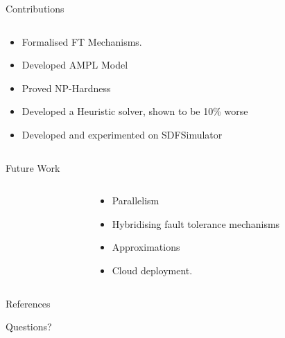 \documentclass{beamer}
\begin{document}
\begin{frame}{Contributions}
\begin{columns}
\begin{column}{5cm}
\begin{itemize}
	\item Formalised FT Mechanisms.
	\item Developed AMPL Model
	\item Proved NP-Hardness
	\item Developed a Heuristic solver, shown to be 10\% worse
	\item Developed and experimented on SDFSimulator
\end{itemize}
\end{column}
\begin{column}{5cm}
\end{column}
\end{columns}
\end{frame}

\begin{frame}{Future Work}
\begin{columns}
\begin{column}{5cm}
\end{column}
\begin{column}{5cm}
\begin{itemize}
	\item Parallelism
	\item Hybridising fault tolerance mechanisms
	\item Approximations
	\item Cloud deployment.
\end{itemize}
\end{column}
\end{columns}
\end{frame}

\begin{frame}[allowframebreaks]{References}


\end{frame}

\begin{frame}{Questions?}
\end{frame}
\end{document}
